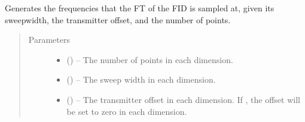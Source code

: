 \documentclass[letterpaper,10pt,english]{sphinxmanual}
\begin{document}
\begin{fulllineitems}
\label{\detokenize{references/sig:nmrespy.sig.get_shifts}}
\sphinxAtStartPar
Generates the frequencies that the FT of the FID is sampled at, given
its sweep\sphinxhyphen{}width, the transmitter offset, and the number of points.
\begin{quote}\begin{description}
\item[{Parameters}] \leavevmode\begin{itemize}
\item {} 
\sphinxAtStartPar
{} (\sphinxstyleliteralemphasis{\sphinxupquote{{[}}}\sphinxstyleliteralemphasis{\sphinxupquote{{]} or }}\sphinxstyleliteralemphasis{\sphinxupquote{{[}}}\sphinxstyleliteralemphasis{\sphinxupquote{, }}\sphinxstyleliteralemphasis{\sphinxupquote{{]}}}) – The number of points in each dimension.

\item {} 
\sphinxAtStartPar
{} (\sphinxstyleliteralemphasis{\sphinxupquote{{[}}}\sphinxstyleliteralemphasis{\sphinxupquote{{]} or }}\sphinxstyleliteralemphasis{\sphinxupquote{{[}}}\sphinxstyleliteralemphasis{\sphinxupquote{, }}\sphinxstyleliteralemphasis{\sphinxupquote{{]}}}) – The sweep width in each dimension.

\item {} 
\sphinxAtStartPar
{} (\sphinxstyleliteralemphasis{\sphinxupquote{{[}}}\sphinxstyleliteralemphasis{\sphinxupquote{{]}}}\sphinxstyleliteralemphasis{\sphinxupquote{, }}\sphinxstyleliteralemphasis{\sphinxupquote{{[}}}\sphinxstyleliteralemphasis{\sphinxupquote{, }}\sphinxstyleliteralemphasis{\sphinxupquote{{]}}}\sphinxstyleliteralemphasis{\sphinxupquote{, }}) – The transmitter offset in each dimension. If , the
offset will be set to zero in each dimension.


\end{itemize}
\end{description}
\end{quote}
\end{fulllineitems}
\end{document}

